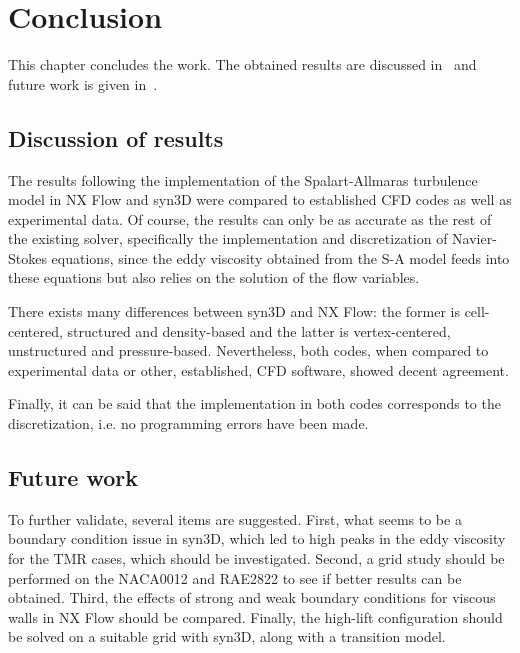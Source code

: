 \chapter{Conclusion}
This chapter concludes the work. The obtained results are discussed in~ and future work is given in~.

\section{Discussion of results}
\label{sec:conclusionresults}
The results following the implementation of the Spalart-Allmaras turbulence model in NX Flow and syn3D were compared to established CFD codes as well as experimental data. Of course, the results can only be as accurate as the rest of the existing solver, specifically the implementation and discretization of Navier-Stokes equations, since the eddy viscosity obtained from the S-A model feeds into these equations but also relies on the solution of the flow variables.

There exists many differences between syn3D and NX Flow: the former is cell-centered, structured and density-based and the latter is vertex-centered, unstructured and pressure-based. Nevertheless, both codes, when compared to experimental data or other, established, CFD software, showed decent agreement.

Finally, it can be said that the implementation in both codes corresponds to the discretization, i.e. no programming errors have been made.

\section{Future work}
\label{sec:future}
To further validate, several items are suggested. First, what seems to be a boundary condition issue in syn3D, which led to high peaks in the eddy viscosity for the TMR cases, which should be investigated. Second, a grid study should be performed on the NACA0012 and RAE2822 to see if better results can be obtained. Third, the effects of strong and weak boundary conditions for viscous walls in NX Flow should be compared. Finally, the high-lift configuration should be solved on a suitable grid with syn3D, along with a transition model. 
